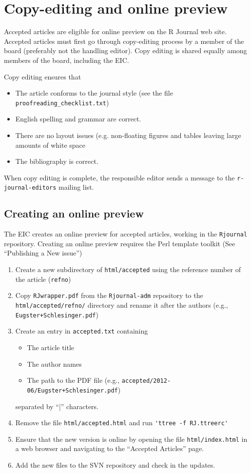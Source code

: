 \documentclass[11pt]{article}
\begin{document}
\section{Copy-editing and online preview}

Accepted articles are eligible for online preview on the R Journal web
site.  Accepted articles must first go through copy-editing process by
a member of the board (preferably not the handling editor). Copy
editing is shared equally among members of the board, including the
EIC.

Copy editing ensures that 
\begin{itemize}
\item The article conforms to the journal style (see the file
  \verb+proofreading_checklist.txt+)
\item English spelling and grammar are correct.
\item There are no layout issues (e.g. non-floating figures and tables
  leaving large amounts of white space
\item The bibliography is correct.
\end{itemize}
When copy editing is complete, the responsible editor sends a message
to the \verb+r-journal-editors+ mailing list.

\subsection{Creating an online preview}

The EIC creates an online preview for accepted articles, working
in the \texttt{Rjournal} repository. Creating an online preview
requires the Perl template toolkit (See ``Publishing a New issue'')

\begin{enumerate}
\item Create a new subdirectory of \verb+html/accepted+ using the
  reference number of the article (\verb+refno+)
\item Copy \texttt{RJwrapper.pdf} from the \texttt{Rjournal-adm}
  repository to the \verb+html/accepted/refno/+ directory and rename it
  after the authors (e.g., \verb|Eugster+Schlesinger.pdf|)
\item Create an entry in \texttt{accepted.txt} containing 
  \begin{itemize}
  \item The article title
  \item The author names
  \item The path to the PDF file (e.g.,
    \verb|accepted/2012-06/Eugster+Schlesinger.pdf|)
  \end{itemize}
  separated by ``|'' characters.
\item Remove the file \verb+html/accepted.html+ and run
  \verb+'ttree -f RJ.ttreerc'+
\item Ensure that the new version is online by opening the file 
\verb+html/index.html+ in a web browser and navigating to the
``Accepted Articles'' page.
\item Add the new files to the SVN repository and check in the updates.
\end{enumerate}
\end{document}
